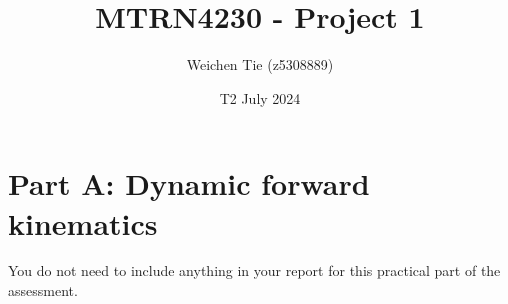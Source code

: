 \documentclass[11pt]{article}
\title{MTRN4230 - Project 1}
\author{Weichen Tie (z5308889)}
\date{T2 July 2024}
\begin{document}
\maketitle
\tableofcontents
\section{Part A: Dynamic forward kinematics}
You do not need to include anything in your report for this practical part of the assessment.





\end{document}
